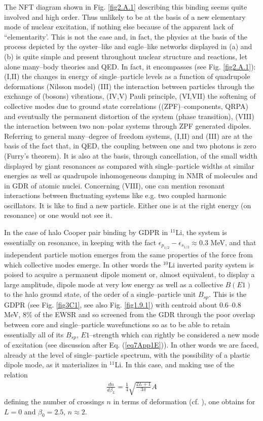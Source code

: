 \begin{subappendices}
The NFT diagram shown in Fig. \ref{fig2.A.1} describing this binding seems quite involved and high order. Thus unlikely to be at the basis of a new elementary mode of nuclear excitation, if nothing else because of the apparent lack of ``elementarity'. This is not the case and, in fact, the physics at the basis of the process depicted by the oyster--like and eagle--like networks displayed in (a) and (b) is quite simple and present throughout nuclear structure and reactions, let alone many--body theories and QED. In fact, it encompasses (see Fig. \ref{fig2.A.1}): (I,II) the changes in energy of single--particle levels as a function of quadrupole deformations (Nilsson model) (III) the interaction between particles through the exchange of (bosons) vibrations, (IV,V) Pauli principle, (VI,VII) the softening of collective modes due to ground state correlations ((ZPF)--components, QRPA) and eventually the permanent distortion of the system (phase transition), (VIII) the interaction between two non--polar systems through ZPF generated dipoles. Referring to general many--degree of freedom systems, (I,II) and (III) are at the basis of the fact that, in QED, the coupling between one and two photons is zero (Furry's theorem). It is also at the basis, through cancellation, of the small width displayed by giant resonances as compared with single--particle widths at similar energies as well as quadrupole inhomogeneous damping   in NMR of molecules  and in GDR of atomic nuclei. Concerning (VIII), one can mention resonant interactions between fluctuating systems like e.g. two coupled harmonic oscillators. It is like to find a new particle. Either one is at the right energy (on resonance) or one would not see it.


In the case of halo Cooper pair binding by GDPR in $^{11}$Li, the system is essentially on resonance, in keeping with the fact $\epsilon_{p_{1/2}}-\epsilon_{s_{1/2}}\approx 0.3$ MeV, and that independent particle motion emerges from the same properties of the force from which collective modes emerge. In other words the $^{10}$Li inverted parity system is poised to acquire a permanent dipole moment or, almost equivalent, to display a large amplitude, dipole mode at very low energy as well as a collective $B(E1)$ to the halo ground state, of the order of a single--particle unit $B_{sp}$. This is the GDPR (see Fig. \ref{fig3C1}, see also Fig. \ref{fig1.9.1}) with centroid about 0.6--0.8 MeV, 8\% of the EWSR and so screened from the GDR through the poor overlap between core and single--particle wavefunctions so as to be able to retain essentially all of its $B_{sp}$, $E1$--strength which can rightly be considered a new mode of excitation (see discussion after Eq. (\ref{eq7App1E})). In other words we are faced, already at the level of single--particle spectrum, with the possibility of a plastic dipole mode, as it materializes in $^{11}$Li. In this case, and making use of the relation 
\begin{align}\label{eq3C6}
\frac{dn}{d\beta_L}=\frac{1}{4}\sqrt{\frac{2L+1}{3\pi}}A
\end{align}  
defining the number of crossings $n$ in terms of deformation (cf. \cite{Bertsch:05}), one obtains for $L=0$ and $\beta_0=2.5$, $n\approx 2$.


\end{subappendices}

